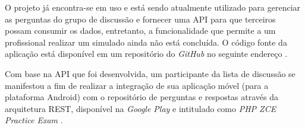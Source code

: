O projeto já encontra-se em uso e está sendo atualmente utilizado para 
gerenciar as perguntas do grupo de discussão e fornecer uma \ac{API} para que 
terceiros possam consumir os dados, entretanto, a funcionalidade que permite a
um profissional realizar um simulado ainda não está concluída. O código fonte da
aplicação está disponível em um repositório do \textit{GitHub} no seguinte
endereço \cite{githubZCPE}.

Com base na \acs{API} que foi desenvolvida, um participante da lista de
discussão se manifestou a fim de realizar a integração de sua aplicação móvel (para a
plataforma Android) com o repositório de perguntas e respostas através da arquitetura
\ac{REST}, disponível na \textit{Google Play} e intitulado como \textit{PHP ZCE
Practice Exam} \cite{googlePlayPHPZCEPracticeExam}.




